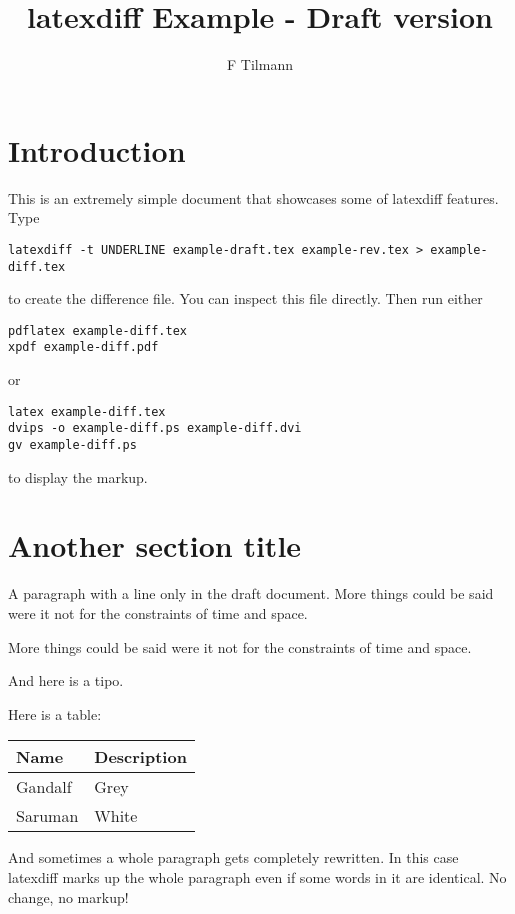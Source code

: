 \documentclass[12pt,a4paper]{article}
\title{latexdiff Example - Draft version}
\author{F Tilmann}
\newenvironment{DIFnomarkup}{}{}
\begin{document}
\maketitle

\section*{Introduction}

This is an extremely simple document that showcases some of latexdiff features.
Type
\begin{verbatim}
latexdiff -t UNDERLINE example-draft.tex example-rev.tex > example-diff.tex
\end{verbatim}
to create the difference file.  You can inspect this file directly. Then run either 
\begin{verbatim}
pdflatex example-diff.tex
xpdf example-diff.pdf
\end{verbatim}
or
\begin{verbatim}
latex example-diff.tex
dvips -o example-diff.ps example-diff.dvi
gv example-diff.ps
\end{verbatim}
to display the markup.

\section*{Another section title}

A paragraph with a line only in the draft document.  More things could be said 
were it not for the constraints of time and space.

More things could be said were it not for the constraints of time and space.

And here is a tipo. 

Here is a table:

\begin{DIFnomarkup}
\begin{tabular}{ll}
Name & Description \\
\hline
Gandalf & Grey \\
Saruman & White
\end{tabular}
\end{DIFnomarkup}

And sometimes a whole paragraph gets completely rewritten. In this
case latexdiff marks up the whole paragraph even if some words in it
are identical.
No change, no markup!
\end{document}
